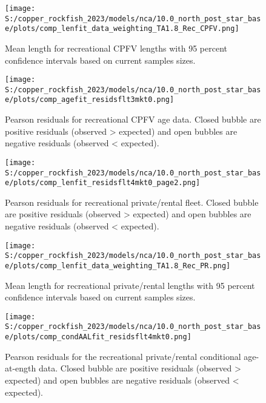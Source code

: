 \documentclass[11pt,
  letterpaper,
]{article}
\begin{document}
\pagebreak

\begin{figure}
{\centering
\texttt{[image: S:/copper\_rockfish\_2023/models/nca/10.0\_north\_post\_star\_base/plots/comp\_lenfit\_data\_weighting\_TA1.8\_Rec\_CPFV.png]}
}
\caption{Mean length for recreational CPFV lengths with 95 percent confidence intervals based on current samples sizes.\label{fig:rec-cpfv-mean-len-fit}}
\end{figure}

\pagebreak

\begin{figure}
{\centering
\texttt{[image: S:/copper\_rockfish\_2023/models/nca/10.0\_north\_post\_star\_base/plots/comp\_agefit\_residsflt3mkt0.png]}
}
\caption{Pearson residuals for recreational CPFV age data. Closed bubble are positive residuals (observed > expected) and open bubbles are negative residuals (observed < expected).\label{fig:rec-cpfv-age-pearson}}
\end{figure}

\pagebreak

\begin{figure}
{\centering
\texttt{[image: S:/copper\_rockfish\_2023/models/nca/10.0\_north\_post\_star\_base/plots/comp\_lenfit\_residsflt4mkt0\_page2.png]}
}
\caption{Pearson residuals for recreational private/rental fleet. Closed bubble are positive residuals (observed > expected) and open bubbles are negative residuals (observed < expected).\label{fig:rec-pr-pearson}}
\end{figure}

\pagebreak

\begin{figure}
{\centering
\texttt{[image: S:/copper\_rockfish\_2023/models/nca/10.0\_north\_post\_star\_base/plots/comp\_lenfit\_data\_weighting\_TA1.8\_Rec\_PR.png]}
}
\caption{Mean length for recreational private/rental lengths with 95 percent confidence intervals based on current samples sizes.\label{fig:rec-pr-mean-len-fit}}
\end{figure}

\pagebreak

\begin{figure}
{\centering
\texttt{[image: S:/copper\_rockfish\_2023/models/nca/10.0\_north\_post\_star\_base/plots/comp\_condAALfit\_residsflt4mkt0.png]}
}
\caption{Pearson residuals for the recreational private/rental conditional age-at-ength data. Closed bubble are positive residuals (observed > expected) and open bubbles are negative residuals (observed < expected).\label{fig:rec-pr-age-pearson}}
\end{figure}
\end{document}
